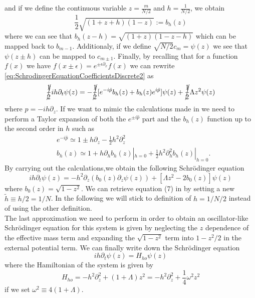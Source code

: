 and if we define the continuous variable $ z = \frac{m}{N/2} $  and $ h = \frac{1}{N/2} $, we obtain
\begin{equation}
	\label{eq:CoefficientContinuous}
	\frac{1}{2}
	\sqrt{
		\left(1 + z +h\right)
		\left(1 -z\right)
	}
	:=  b_{h}(z)
\end{equation}
where we can see that $ b_{h}(z-h) = \sqrt{ \left(1 + z \right)\left(1 -z -h\right) } $ which can be mapped back to $ b_{m-1} $.
Additionaly, if we define $ \sqrt{N/2}  c_{m}= \psi(z) $ we see that $ \psi(z \pm h) $ can be mapped to $ c_{m\pm 1} $.
Finally, by recalling that for a function $f(x)$ we have $ f(x \pm \epsilon) = e^{\pm \epsilon\partial_{x}}f(x) $ we can rewrite \cref{eq:SchrodingerEquationCoefficientsDiscrete2} as
\begin{equation}
	\label{eq:SchrodingerEquationCoefficientsContinuous}
	\cancel{\frac{1}{2}}ih\partial_t\psi(z) =
	-\cancel{\frac{1}{2}}[ e^{-i\hat{p}} b_{h}(z) + b_{h}(z)e^{i\hat{p}} ]\psi(z) +
	\cancel{\frac{1}{2}}\Lambda z^2 \psi(z)
\end{equation}
where $ \hat{p} = -ih\partial_z $.
If we want to mimic the calculations made in \cite{FastGenerationJulia2012} we need to perform a Taylor expansion of both the $ e^{\pm i\hat{p}} $ part and the $ b_{h}(z) $ function up to the second order in $ h $ such as
\begin{align}
	 & e^{-i\hat{p}}  \simeq 1 \pm h \partial_{z} - \frac{1}{2}h^2\partial^2_{z} \label{eq:TaylorExpansionExp }                         \\
	 & b_{h}(z) \simeq  1 + h \partial_{h}b_{h}(z)|_{h = 0} + \frac{1}{2}h^2\partial_h^2b_{h}(z)|_{h = 0} \label{eq:TaylorExpansionB }.
\end{align}
By carrying out the calculations,we obtain the following Schr{\"o}dinger equation
\begin{equation}
	\label{eq:TaylorExpansionHamiltonian}
	ih\partial_t\psi(z) =
	-h^2\partial_z\left(b_{0}(z)\partial_z\psi(z) \right)+
	\left[ 	\Lambda z^2 - 2b_{0}(z) \right] \psi(z)
\end{equation}
where $ b_{0}(z) = \sqrt{1-z^2}  $.
We can retrieve equation (7) in \cite{FastGenerationJulia2012} by setting a new $ \tilde{h} \equiv h/2 = 1/N $.
In the following we will stick to definition of $ h = 1/N/2 $ instead of using the other definition.\\
The last approximation we need to perform in order to obtain an oscillator-like Schr{\"o}dinger equation for this system is given by neglecting the $ z $ dependence of the effective mass term and expanding the $ \sqrt{1 - z^2}  $ term into $ 1 - z^2/2 $ in the external potential term. We can finally write down the Schr{\"o}dinger equation
\begin{equation}
	\label{eq:SchrodingerEquationHarmonicLike}
	ih\partial_t\psi(z) = H_{ho}\psi(z)
\end{equation}
where the Hamiltonian of the system is given by
\begin{equation}
	\label{eq:HamiltonianJosephsonJunctionHarmonic}
	H_{ho} = -h^2\partial_z^2 + (1 + \Lambda)z^2  =
	-h^2\partial_z^2 + \frac{1}{4}\omega^2 z^2
\end{equation}
if we set $ \omega^2 \equiv 4(1+\Lambda) $.
